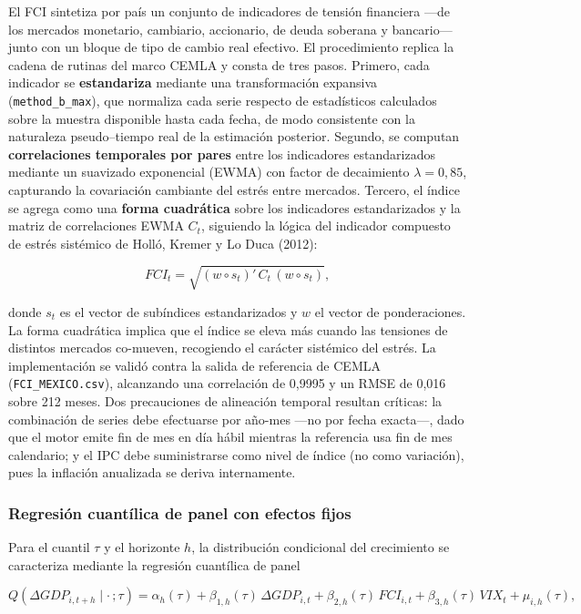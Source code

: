 \documentclass[5p,times,twocolumn,authoryear]{elsarticle}
\begin{document}
El FCI sintetiza por país un conjunto de indicadores de tensión financiera —de los mercados monetario, cambiario, accionario, de deuda soberana y bancario— junto con un bloque de tipo de cambio real efectivo. El procedimiento replica la cadena de rutinas del marco CEMLA y consta de tres pasos. Primero, cada indicador se \textbf{estandariza} mediante una transformación expansiva (\texttt{method\_b\_max}), que normaliza cada serie respecto de estadísticos calculados sobre la muestra disponible hasta cada fecha, de modo consistente con la naturaleza pseudo–tiempo real de la estimación posterior. Segundo, se computan \textbf{correlaciones temporales por pares} entre los indicadores estandarizados mediante un suavizado exponencial (EWMA) con factor de decaimiento $\lambda = 0{,}85$, capturando la covariación cambiante del estrés entre mercados. Tercero, el índice se agrega como una \textbf{forma cuadrática} sobre los indicadores estandarizados y la matriz de correlaciones EWMA $C_t$, siguiendo la lógica del indicador compuesto de estrés sistémico de Holló, Kremer y Lo Duca (2012):

\[ FCI_t = \sqrt{(w \circ s_t)'\,C_t\,(w \circ s_t)}, \]

donde $s_t$ es el vector de subíndices estandarizados y $w$ el vector de ponderaciones. La forma cuadrática implica que el índice se eleva más cuando las tensiones de distintos mercados co-mueven, recogiendo el carácter sistémico del estrés. La implementación se validó contra la salida de referencia de CEMLA (\texttt{FCI\_MEXICO.csv}), alcanzando una correlación de 0,9995 y un RMSE de 0,016 sobre 212 meses. Dos precauciones de alineación temporal resultan críticas: la combinación de series debe efectuarse por año-mes —no por fecha exacta—, dado que el motor emite fin de mes en día hábil mientras la referencia usa fin de mes calendario; y el IPC debe suministrarse como nivel de índice (no como variación), pues la inflación anualizada se deriva internamente.

\subsubsection{Regresión cuantílica de panel con efectos fijos}

Para el cuantil $\tau$ y el horizonte $h$, la distribución condicional del crecimiento se caracteriza mediante la regresión cuantílica de panel

\[ Q\!\left(\Delta GDP_{i,t+h}\mid \cdot\,;\tau\right) = \alpha_h(\tau) + \beta_{1,h}(\tau)\,\Delta GDP_{i,t} + \beta_{2,h}(\tau)\,FCI_{i,t} + \beta_{3,h}(\tau)\,VIX_t + \mu_{i,h}(\tau), \]
\end{document}
